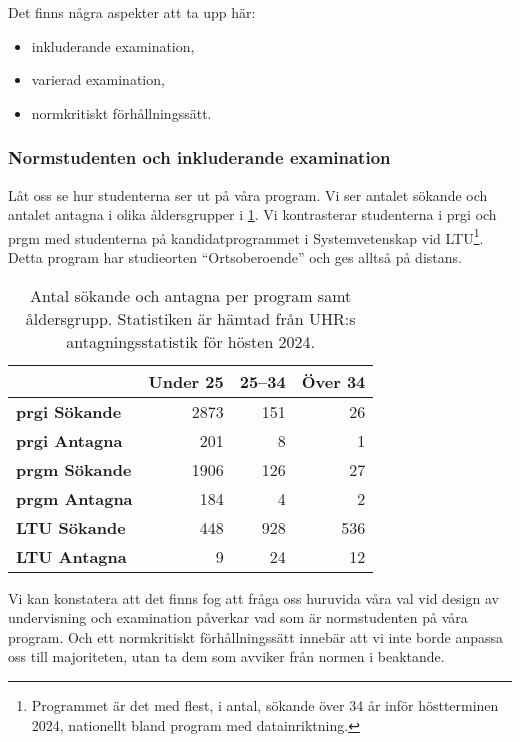 Det finns några aspekter att ta upp här:
\begin{itemize}
  \item inkluderande examination,
  \item varierad examination,
  \item normkritiskt förhållningssätt.
\end{itemize}

\subsubsection{Normstudenten och inkluderande examination}

Låt oss se hur studenterna ser ut på våra program.
Vi ser antalet sökande och antalet antagna i olika åldersgrupper i 
\cref{ÅlderStudenter}.
Vi kontrasterar studenterna i prgi och prgm med studenterna på 
kandidatprogrammet i Systemvetenskap vid LTU\footnote{%
  Programmet är det med flest, i antal, sökande över 34 år inför höstterminen 
  2024, nationellt bland program med datainriktning.
}.
Detta program har studieorten \enquote{Ortsoberoende} och ges alltså på 
distans.

\begin{table}
  \caption{%
    Antal sökande och antagna per program samt åldersgrupp.
    Statistiken är hämtad från UHR:s antagningsstatistik för hösten 2024.%
  }%
  \label{ÅlderStudenter}
  \centering
  \begin{tabular}{lrrr}
    \toprule
    & \textbf{Under 25} & \textbf{25--34} & \textbf{Över 34} \\
    \midrule
    \textbf{prgi Sökande} & 2873 & 151 & 26 \\
    \textbf{prgi Antagna} & 201 & 8 & 1 \\
    \midrule
    \textbf{prgm Sökande} & 1906 & 126 & 27 \\
    \textbf{prgm Antagna} & 184 & 4 & 2 \\
    \midrule
    \textbf{LTU Sökande} & 448 & 928 & 536 \\
    \textbf{LTU Antagna} & 9 & 24 & 12 \\
    \bottomrule
  \end{tabular}
\end{table}

Vi kan konstatera att det finns fog att fråga oss huruvida våra val vid design 
av undervisning och examination påverkar vad som är normstudenten på våra 
program.
Och ett normkritiskt förhållningssätt innebär att vi inte borde anpassa oss 
till majoriteten, utan ta dem som avviker från normen i beaktande.

